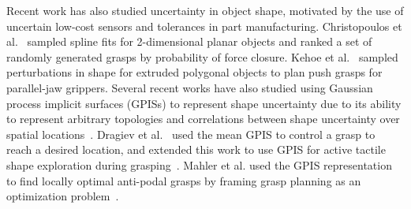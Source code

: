 \documentclass[10pt, conference]{ieeeconf}      %
\begin{document}
Recent work has also studied uncertainty in object shape, motivated by the use of uncertain low-cost sensors and tolerances in part manufacturing.
Christopoulos et al.~\cite{christopoulos2007handling} sampled spline fits for 2-dimensional planar objects and ranked a set of randomly generated grasps by probability of force closure.
Kehoe et al.~\cite{kehoe2012estimating, kehoe2012toward} sampled perturbations in shape for extruded polygonal objects to plan push grasps for parallel-jaw grippers.
Several recent works have also studied using Gaussian process implicit surfaces (GPISs) to represent shape uncertainty due to its ability to represent arbitrary topologies and correlations between shape uncertainty over spatial locations~\cite{dragiev2011, dragiev2013uncertainty, hollinger2013, mahler2015gp}.
Dragiev et al.~\cite{dragiev2011} used the mean GPIS to control a grasp to reach a desired location, and extended this work to use GPIS for active tactile shape exploration during grasping~\cite{dragiev2013uncertainty}.
Mahler et al. used the GPIS representation to find locally optimal anti-podal grasps by framing grasp planning as an optimization problem~\cite{mahler2015gp}. 




\end{document}
